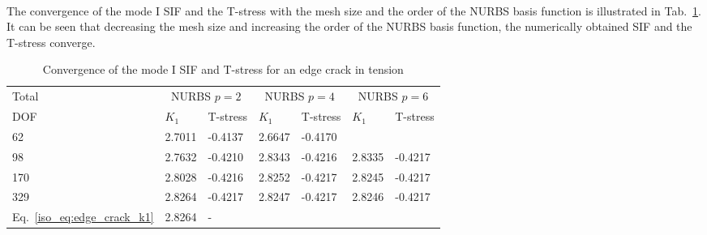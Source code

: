 \paragraph{}
The convergence of the mode \RN{1} SIF and the T-stress with the mesh size and the order of the NURBS basis function is illustrated in Tab.~\ref{iso_tab:edge_crack_res}.
It can be seen that decreasing the mesh size and increasing the order of the NURBS basis function, the numerically obtained SIF and the T-stress converge.
\begin{table}
    \caption{Convergence of the mode \RN{1} SIF and T-stress for an edge crack in tension}
    \label{iso_tab:edge_crack_res}
    \begin{tabularx}{\textwidth}{XXXXXXX}
        \toprule
            Total    &   \multicolumn{2}{c}{NURBS $p=2$} &\multicolumn{2}{c}{NURBS $p=4$} &\multicolumn{2}{c}{NURBS $p=6$}\\
            \cmidrule{2-7}
            DOF      &   $K_1$   &   T-stress            &$K_1$   &   T-stress            &$K_1$   &   T-stress           \\
            \cmidrule{1-1} \cmidrule{2-3} \cmidrule{4-5} \cmidrule{6-7}
            62       &   2.7011  &   -0.4137             &2.6647  &-0.4170                &        &                      \\
            98       &   2.7632  &   -0.4210             &2.8343  &-0.4216                &2.8335  &-0.4217               \\
            170      &   2.8028  &   -0.4216             &2.8252  &-0.4217                &2.8245  &-0.4217               \\
            329      &   2.8264  &   -0.4217             &2.8247  &-0.4217                &2.8246  &-0.4217               \\
            Eq.~\ref{iso_eq:edge_crack_k1} & 2.8264 & - & & & & \\
        \bottomrule
        \end{tabularx}
\end{table}

\pagebreak